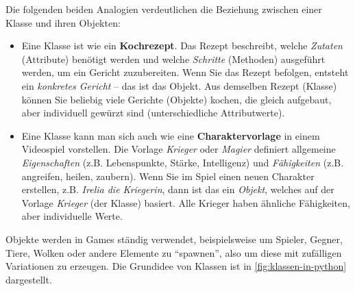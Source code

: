 Die folgenden beiden Analogien verdeutlichen die Beziehung zwischen einer Klasse und ihren Objekten:
\begin{itemize}
	\item Eine Klasse ist wie ein \textbf{Kochrezept}. Das Rezept beschreibt, welche \textit{Zutaten} (Attribute) benötigt werden und welche \textit{Schritte} (Methoden) ausgeführt werden, um ein Gericht zuzubereiten. Wenn Sie das Rezept befolgen, entsteht ein \textit{konkretes Gericht} -- das ist das Objekt. Aus demselben Rezept (Klasse) können Sie beliebig viele Gerichte (Objekte) kochen, die gleich aufgebaut, aber individuell gewürzt sind (unterschiedliche Attributwerte).
	
	\item Eine Klasse kann man sich auch wie eine \textbf{Charaktervorlage} in einem Videospiel vorstellen. Die Vorlage \textit{Krieger} oder \textit{Magier} definiert allgemeine \textit{Eigenschaften} (z.B. Lebenspunkte, Stärke, Intelligenz) und \textit{Fähigkeiten} (z.B. angreifen, heilen, zaubern). Wenn Sie im Spiel einen neuen Charakter erstellen, z.B. \textit{Irelia die Kriegerin}, dann ist das ein \textit{Objekt}, welches auf der Vorlage \textit{Krieger} (der Klasse) basiert. Alle Krieger haben ähnliche Fähigkeiten, aber individuelle Werte.
\end{itemize}

Objekte werden in Games ständig verwendet, beispielsweise um Spieler, Gegner, Tiere, Wolken oder andere Elemente zu \enquote{spawnen}, also um diese mit zufälligen Variationen zu erzeugen. Die Grundidee von Klassen ist in \cref{fig:klassen-in-python} dargestellt.

